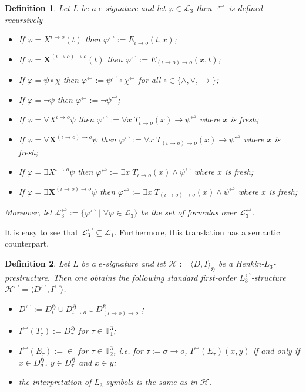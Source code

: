 \documentclass[11pt,a4paper]{article}
\newtheorem{mydef}{Definition}
\newcommand{\tofo}{\hookleftarrow}
\newcommand{\os}{\iota \to o}
\newcommand{\ot}{(\iota \to o)\to o}
\begin{document}
\begin{mydef}
Let $L$ be a $e$-signature and let $\varphi \in \mathcal{L}_3$ then $\cdot^{\tofo}$ is defined recursively 
\begin{itemize}
\item If $\varphi = X^{\os}(t)$ then $\varphi^{\tofo}:=E_{\os}(t, x)$;
\item If $\varphi = \mathbf{X}^{\ot}(t)$ then $\varphi^{\tofo}:=E_{\ot}(x, t)$;
\item If $\varphi = \psi \circ \chi$ then $\varphi^{\tofo}:=\psi^{\tofo} \circ \chi^{\tofo} $ for all $\circ \in \{ \land ,\lor, \to \}$;
\item If $\varphi = \neg \psi$ then $\varphi^{\tofo}:=\neg \psi^{\tofo}$;
\item If $\varphi = \forall X^{\os}  \psi$ then $\varphi^{\tofo}:=\forall x \; T_{\os}(x) \to \psi^{\tofo}$ where $x$ is fresh;
\item If $\varphi = \forall \mathbf{X}^{\ot}  \psi$ then $\varphi^{\tofo}:=\forall x \; T_{\ot}(x) \to \psi^{\tofo}$ where $x$ is fresh;
\item If $\varphi = \exists X^{\os}  \psi$ then $\varphi^{\tofo}:=\exists x \; T_{\os}(x) \land \psi^{\tofo}$ where $x$ is fresh;
\item If $\varphi = \exists \mathbf{X}^{\ot}  \psi$ then $\varphi^{\tofo}:=\exists x \; T_{\ot}(x) \land \psi^{\tofo}$ where $x$ is fresh;
\end{itemize}
Moreover, let $\mathcal{L}_3^{\tofo}:=\{\varphi^{\tofo} \mid \forall \varphi \in \mathcal{L}_3\}$ be the set of formulas over $\mathcal{L}_3^{\tofo}$.
\end{mydef} 
It is easy to see that $\mathcal{L}_3^{\tofo} \subseteq \mathcal{L}_1$. Furthermore, this translation has a semantic counterpart. 

\begin{mydef}
Let $L$ be a $e$-signature and let $\mathcal{H}:=\langle D, I \rangle_{\mathfrak{H}}$ be a Henkin-$L_3$-prestructure. Then one obtains the following standard first-order $L_3^{\tofo}$-structure $\mathcal{H}^{\tofo}=\langle D^{\tofo}, I^{\tofo} \rangle$.
\begin{itemize}
\item $D^{\tofo}:=D_{\iota}^{\mathfrak{H}} \cup D_{\iota \to o}^{\mathfrak{H}} \cup D_{(\iota \to o) \to o}^{\mathfrak{H}}$ ;
\item $I^{\tofo}(T_{\tau}) := D_{\tau}^{\mathfrak{H}}$ for $\tau \in \mathbb{T}_1^3$;
\item $I^{\tofo}(E_{\tau}) := \in$ for $\tau \in \mathbb{T}_2^3$, i.e. for $\tau:= \sigma \to o$, $I^{\tofo}(E_{\tau})(x,y)$ if and only if $x \in  D_{\sigma}^{\mathfrak{H}}$, $y \in  D_{\tau}^{\mathfrak{H}}$ and $x \in y$;
\item the interpretation of $L_3$-symbols is the same as in $\mathcal{H}$.
\end{itemize}
\end{mydef} 
\end{document}

